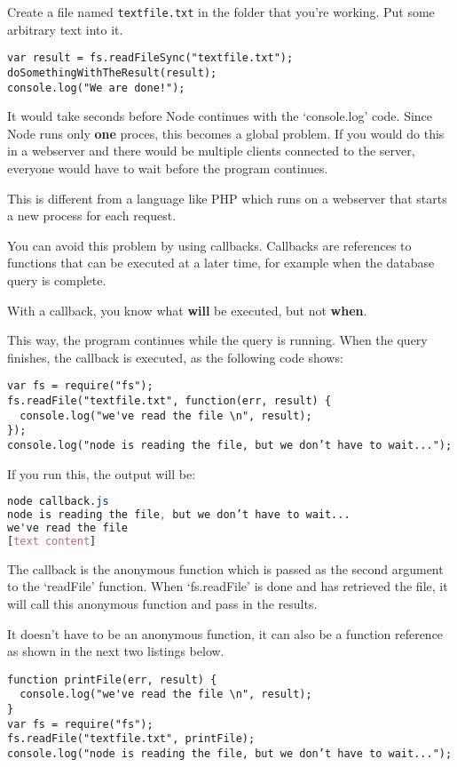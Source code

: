 \documentclass[a4paper]{report}
\begin{document}
Create a file named \texttt{textfile.txt} in the folder that you're working. Put some arbitrary text into it.

\begin{lstlisting} 
var result = fs.readFileSync("textfile.txt");
doSomethingWithTheResult(result); 
console.log("We are done!"); 
\end{lstlisting}
\noindent It would take seconds before Node continues with the `console.log' code. Since Node runs only \textbf{one} proces, this becomes a global problem. If you would do this in a webserver and there would be multiple clients connected to the server, everyone would have to wait before the program continues.  
 
This is different from a language like PHP which runs on a webserver that starts a new process for each request. 
 
You can avoid this problem by using callbacks. Callbacks are references to functions that can be executed at a later time, for example when the database query is complete.  
 
With a callback, you know what \textbf{will} be executed, but not \textbf{when}. 
 
This way, the program continues while the query is running. When the query finishes, the callback is executed, as the following code shows: 
 
\begin{lstlisting} 
var fs = require("fs");
fs.readFile("textfile.txt", function(err, result) {
  console.log("we've read the file \n", result);
});
console.log("node is reading the file, but we don’t have to wait...");
\end{lstlisting} 

If you run this, the output will be: 
\begin{lstlisting}[language=css] 
node callback.js
node is reading the file, but we don’t have to wait...
we've read the file
[text content]
\end{lstlisting} 
 
 
\noindent The callback is the anonymous function which is passed as the second argument to the `readFile' function. When `fs.readFile' is done and has retrieved the file, it will call this anonymous function and pass in the results. 
 
It doesn't have to be an anonymous function, it can also be a function reference as shown in the next two listings below. 
 
\begin{lstlisting} 
function printFile(err, result) {
  console.log("we've read the file \n", result);
}
var fs = require("fs");
fs.readFile("textfile.txt", printFile);
console.log("node is reading the file, but we don’t have to wait...");
\end{lstlisting} 
 
\end{document}
